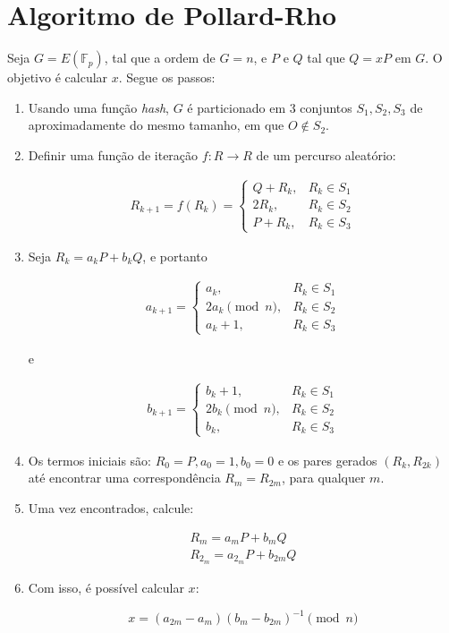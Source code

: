 \section{Algoritmo de Pollard-Rho}
Seja $G = E(\mathbb{F}_p)$, tal que a ordem de $G = n$, e \(P\) e \(Q\) tal que $Q = xP$ em \(G\). O objetivo é calcular \(x\). Segue os passos:

\begin{enumerate}
\item Usando uma função \textit{hash}, \(G\) é particionado em 3 conjuntos $S_1, S_2, S_3$ de aproximadamente do mesmo tamanho, em que $O \notin S_2$.
\item Definir uma função de iteração $f : R \to R$ de um percurso aleatório:

\begin{eqnarray} \label{eq:walk}
R_{k+1} = f(R_k) =
\begin{cases}
Q + R_k, &R_k \in S_1 \\
2R_k, &R_k \in S_2 \\
P + R_k, &R_k \in S_3
\end{cases}
\end{eqnarray}

\item Seja $R_k = a_kP + b_kQ$, e portanto

\begin{eqnarray}
a_{k+1} =
\begin{cases}
a_k, &R_k \in S_1 \\
2a_k \pmod n, &R_k \in S_2 \\
a_k + 1, &R_k \in S_3
\end{cases}
\end{eqnarray}

e

\begin{eqnarray}
b_{k+1} =
\begin{cases}
b_k + 1, &R_k \in S_1 \\
2b_k \pmod n, &R_k \in S_2 \\
b_k, &R_k \in S_3
\end{cases}
\end{eqnarray}

\item Os termos iniciais são: $R_0 = P, a_0 = 1, b_0 = 0$ e os pares gerados $(R_k, R_{2k})$ até encontrar uma correspondência $R_m = R_{2m}$, para qualquer \(m\).

\item Uma vez encontrados, calcule:

\begin{eqnarray*}
R_m = a_mP + b_mQ \\
R_{2_m} = a_{2_m}P + b_{2m}Q
\end{eqnarray*}

\item Com isso, é possível calcular \(x\):

\begin{equation} \label{eq:x}
x = (a_{2m} - a_m)(b_m - b_{2m})^{-1} \pmod n
\end{equation}

\end{enumerate}

